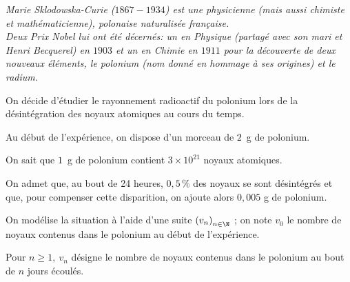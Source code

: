 \medskip

\emph{Marie Sklodowska-Curie ($1867-1934$) est une physicienne (mais aussi chimiste et mathématicienne), polonaise naturalisée française.\\
Deux Prix Nobel lui ont été décernés: un en Physique (partagé avec son mari et Henri Becquerel) en $1903$ et un en Chimie en $1911$ pour la découverte de deux nouveaux éléments, le polonium (nom donné en hommage à ses origines) et le radium}.

\medskip

On décide d'étudier le rayonnement radioactif du polonium lors de la désintégration des noyaux atomiques au cours du temps.

Au début de l'expérience, on dispose d'un morceau de $2$~g de polonium.

On sait que $1$~g de polonium contient $3 \times 10^{21}$ noyaux atomiques.

On admet que, au bout de 24 heures, $0,5\,\%$ des noyaux se sont désintégrés et que, pour compenser cette disparition, on ajoute alors $0,005$ g de polonium.

On modélise la situation à l'aide d'une suite $\left(v_n\right)_{n \in \N}$ ; on note $v_0$ le nombre de noyaux contenus dans le polonium au début de l'expérience. 

Pour $n \geqslant 1,\: v_n$ désigne le nombre de noyaux contenus dans le polonium au bout de $n$ jours écoulés.

\medskip

